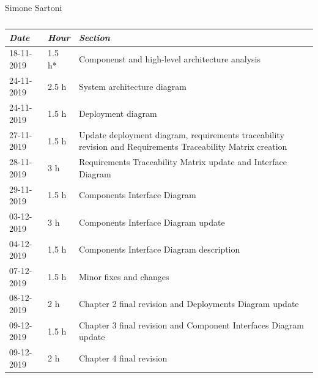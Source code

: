 \documentclass[a4paper]{report}
\begin{document}
\vspace*{1 cm}
\begin{table}[H]
\centering
Simone Sartoni \\
\begin{tabular}{p{2cm}p{1.5cm}p{7cm}}
\toprule
\textit{Date} & \textit{Hour} & \textit{Section} \\ \midrule
18-11-2019 & 1.5  h* & Componenst and high-level architecture analysis \\ \midrule
24-11-2019 & 2.5 h &  System architecture diagram \\ \midrule
24-11-2019 & 1.5 h &  Deployment diagram\\ \midrule
27-11-2019 & 1.5 h & Update deployment diagram, requirements traceability revision and Requirements Traceability Matrix creation \\ \midrule
28-11-2019 & 3 h & Requirements Traceability Matrix update and Interface Diagram \\ \midrule
29-11-2019 & 1.5 h & Components Interface Diagram \\ \midrule
03-12-2019 & 3 h & Components Interface Diagram update \\ \midrule
04-12-2019 & 1.5 h & Components Interface Diagram description \\ \midrule
07-12-2019 & 1.5 h & Minor fixes and changes \\ \midrule
08-12-2019 & 2 h & Chapter 2 final revision and Deployments Diagram update \\ \midrule
09-12-2019 & 1.5 h & Chapter 3 final revision and Component Interfaces Diagram update \\ \midrule
09-12-2019 & 2 h & Chapter 4 final revision\\ 

\bottomrule
\end{tabular}
\caption[Simone Sartoni's effort table]{}
\end{table}
\vspace*{1 cm}
\end{document}
